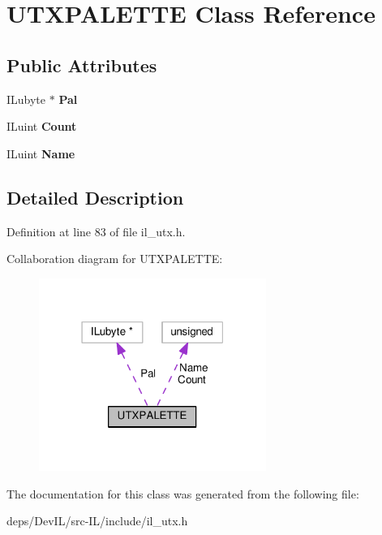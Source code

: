 \hypertarget{classUTXPALETTE}{}\section{U\+T\+X\+P\+A\+L\+E\+T\+TE Class Reference}
\label{classUTXPALETTE}
\subsection*{Public Attributes}
\begin{DoxyCompactItemize}
\item 
\mbox{\label{classUTXPALETTE_a38e8ed6596cf732776010675e7a23a5e}} 
I\+Lubyte $\ast$ {\bfseries Pal}
\item 
\mbox{\label{classUTXPALETTE_af7cdd9deaac4861d4c39f6423f1e36e3}} 
I\+Luint {\bfseries Count}
\item 
\mbox{\label{classUTXPALETTE_a119f5dd212821480664fd62616457b66}} 
I\+Luint {\bfseries Name}
\end{DoxyCompactItemize}


\subsection{Detailed Description}


Definition at line 83 of file il\+\_\+utx.\+h.



Collaboration diagram for U\+T\+X\+P\+A\+L\+E\+T\+TE\+:
\nopagebreak
\begin{figure}[H]
\begin{center}
\leavevmode
\includegraphics[width=210pt]{da/d6c/classUTXPALETTE__coll__graph}
\end{center}
\end{figure}


The documentation for this class was generated from the following file\+:\begin{DoxyCompactItemize}
\item 
deps/\+Dev\+I\+L/src-\/\+I\+L/include/il\+\_\+utx.\+h\end{DoxyCompactItemize}
